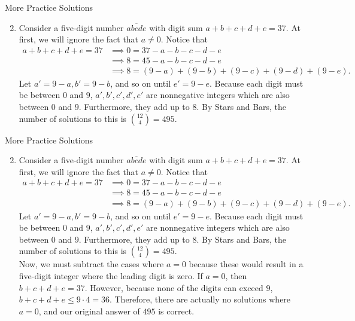 \documentclass[9pt]{beamer}
\begin{document}
\begin{frame}[fragile, t]{More Practice Solutions}
    \begin{enumerate}
    \setcounter{enumi}{1}
        \item Consider a five-digit number $\overline{abcde}$ with digit sum $a+b+c+d+e=37$. At first, we will ignore the fact that $a\neq 0$. Notice that
        \begin{align*}
            a+b+c+d+e=37 &\implies 0=37-a-b-c-d-e\\
            &\implies 8=45-a-b-c-d-e\\
            &\implies 8=(9-a)+(9-b)+(9-c)+(9-d)+(9-e).
        \end{align*}
        Let $a'=9-a,b'=9-b$, and so on until $e'=9-e$. Because each digit must be between $0$ and $9$, $a',b',c',d',e'$ are nonnegative integers which are also between $0$ and $9$. Furthermore, they add up to $8$. By Stars and Bars, the number of solutions to this is $\binom{12}{4}=495$.\\
        \bigskip

    \end{enumerate}
    
\end{frame}





\begin{frame}[fragile, t]{More Practice Solutions}
    \begin{enumerate}
    \setcounter{enumi}{1}
        \item Consider a five-digit number $\overline{abcde}$ with digit sum $a+b+c+d+e=37$. At first, we will ignore the fact that $a\neq 0$. Notice that
        \begin{align*}
            a+b+c+d+e=37 &\implies 0=37-a-b-c-d-e\\
            &\implies 8=45-a-b-c-d-e\\
            &\implies 8=(9-a)+(9-b)+(9-c)+(9-d)+(9-e).
        \end{align*}
        Let $a'=9-a,b'=9-b$, and so on until $e'=9-e$. Because each digit must be between $0$ and $9$, $a',b',c',d',e'$ are nonnegative integers which are also between $0$ and $9$. Furthermore, they add up to $8$. By Stars and Bars, the number of solutions to this is $\binom{12}{4}=495$.\\
        \bigskip
        Now, we must subtract the cases where $a=0$ because these would result in a five-digit integer where the leading digit is zero. If $a=0$, then $b+c+d+e=37$. However, because none of the digits can exceed $9$, $b+c+d+e\le 9\cdot4=36$. Therefore, there are actually no solutions where $a=0$, and our original answer of $495$ is correct.
        
    \end{enumerate}
    
\end{frame}
\end{document}
